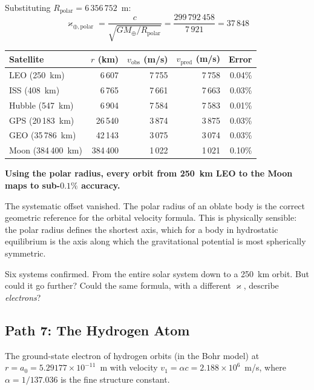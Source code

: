 \documentclass[twocolumn,epjc3]{svjour3}
\newcommand{\kop}{\varkappa}  %
\begin{document}
Substituting $R_{\text{polar}} = 6\,356\,752$~m:
\begin{equation}
  \kop_{\oplus,\text{polar}} = \frac{c}{\sqrt{GM_\oplus/R_{\text{polar}}}} = \frac{299\,792\,458}{7\,921} = 37\,848
\end{equation}

\begin{center}
\small
\begin{tabular}{lrrrr}
\toprule
\textbf{Satellite} & $r$ (km) & $v_{\text{obs}}$ (m/s) & $v_{\text{pred}}$ (m/s) & Error \\
\midrule
LEO (250~km) & 6\,607 & 7\,755 & 7\,758 & 0.04\% \\
ISS (408~km) & 6\,765 & 7\,661 & 7\,663 & 0.03\% \\
Hubble (547~km) & 6\,904 & 7\,584 & 7\,583 & 0.01\% \\
GPS (20\,183~km) & 26\,540 & 3\,874 & 3\,875 & 0.03\% \\
GEO (35\,786~km) & 42\,143 & 3\,075 & 3\,074 & 0.03\% \\
Moon (384\,400~km) & 384\,400 & 1\,022 & 1\,021 & 0.10\% \\
\bottomrule
\end{tabular}
\end{center}

\textbf{Using the polar radius, every orbit from 250~km LEO to the Moon maps to sub-$0.1\%$ accuracy.}

The systematic offset vanished.  The polar radius of an oblate body is the correct geometric reference for the orbital velocity formula.  This is physically sensible: the polar radius defines the shortest axis, which for a body in hydrostatic equilibrium is the axis along which the gravitational potential is most spherically symmetric.

Six systems confirmed.  From the entire solar system down to a 250~km orbit.  But could it go further?  Could the same formula, with a different $\kop$, describe \emph{electrons}?


\subsection{Path 7: The Hydrogen Atom}
\label{sec:path7}

The ground-state electron of hydrogen orbits (in the Bohr model) at $r = a_0 = 5.29177 \times 10^{-11}$~m with velocity $v_1 = \alpha c = 2.188 \times 10^6$~m/s, where $\alpha = 1/137.036$ is the fine structure constant.
\end{document}
